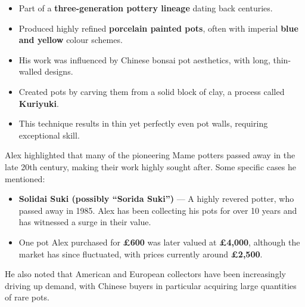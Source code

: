 
\noindent
\begin{itemize}
    \item Part of a \textbf{three\--generation pottery lineage} dating back centuries.
    
    \item Produced highly refined \textbf{porcelain painted pots}, often with imperial \textbf{blue and yellow} colour schemes.
    
    \item His work was influenced by Chinese bonsai pot aesthetics, with long, thin\--walled designs.
\end{itemize}


\noindent
\begin{itemize}
    \item Created pots by carving them from a solid block of clay, a process called \textbf{Kuriyuki}.
    
    \item This technique results in thin yet perfectly even pot walls, requiring exceptional skill.
\end{itemize}


\noindent
Alex highlighted that many of the pioneering Mame potters passed away in the late 20th century, making their work highly sought after.
Some specific cases he mentioned:

\begin{itemize}
    \item \textbf{Solidai Suki (possibly ``Sorida Suki'')} --- A highly revered potter, who passed away in 1985.
    Alex has been collecting his pots for over 10 years and has witnessed a surge in their value.

    \item One pot Alex purchased for \textbf{£600} was later valued at \textbf{£4,000}, although the market has since fluctuated, with prices currently around \textbf{£2,500}.
\end{itemize}

He also noted that American and European collectors have been increasingly driving up demand, with Chinese buyers in particular acquiring large quantities of rare pots.

\medskip

